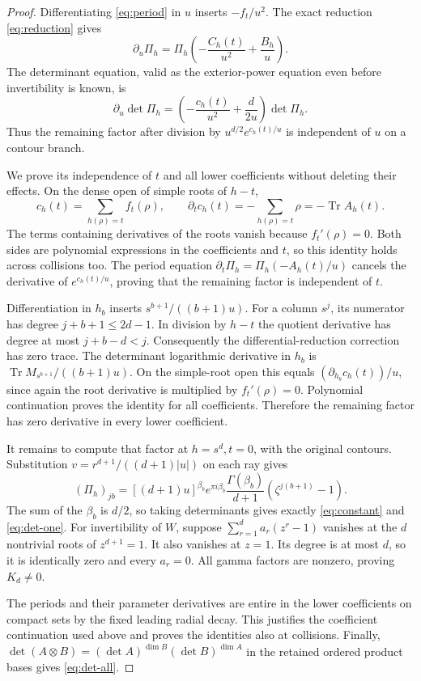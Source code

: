 \documentclass[11pt]{article}
\DeclareMathOperator{\Tr}{Tr}
\begin{document}
\begin{proof}
Differentiating \eqref{eq:period} in $u$ inserts $-f_t/u^2$.
The exact reduction \eqref{eq:reduction} gives
\[
 \partial_u\Pi_h=\Pi_h\left(-\frac{C_h(t)}{u^2}
                                    +\frac{B_h}u\right).
\]
The determinant equation, valid as the exterior-power equation even
before invertibility is known, is
\begin{equation}
 \partial_u\det\Pi_h=
     \left(-\frac{c_h(t)}{u^2}+\frac d{2u}\right)\det\Pi_h.
 \label{eq:det-ode}
\end{equation}
Thus the remaining factor after division by $u^{d/2}e^{c_h(t)/u}$
is independent of $u$ on a contour branch.

We prove its independence of $t$ and all lower coefficients without
deleting their effects.  On the dense open of simple roots of $h-t$,
\[
 c_h(t)=\sum_{h(\rho)=t}f_t(\rho),\qquad
 \partial_t c_h(t)=-\sum_{h(\rho)=t}\rho=-\Tr A_h(t).
\]
The terms containing derivatives of the roots vanish because
$f_t'(\rho)=0$.  Both sides are polynomial expressions in the
coefficients and $t$, so this identity holds across collisions too.
The period equation
$\partial_t\Pi_h=\Pi_h(-A_h(t)/u)$ cancels the derivative of
$e^{c_h(t)/u}$, proving that the remaining factor is independent of $t$.

Differentiation in $h_b$ inserts $s^{b+1}/((b+1)u)$.  For a column
$s^j$, its numerator has degree $j+b+1\le2d-1$.
In division by $h-t$ the quotient derivative has degree at most
$j+b-d<j$.  Consequently the differential-reduction correction has
zero trace.  The determinant logarithmic derivative in $h_b$ is
$\Tr M_{s^{b+1}}/((b+1)u)$.  On the simple-root open this equals
$(\partial_{h_b}c_h(t))/u$, since again the root derivative is multiplied
by $f_t'(\rho)=0$.  Polynomial continuation proves the identity for all
coefficients.  Therefore the remaining factor has zero derivative in
every lower coefficient.

It remains to compute that factor at $h=s^d,t=0$, with the original
contours.  Substitution $v=r^{d+1}/((d+1)|u|)$ on each ray gives
\begin{equation}
 (\Pi_h)_{jb}
  =[(d+1)u]^{\beta_b}e^{\pi i\beta_b}
        \frac{\Gamma(\beta_b)}{d+1}
             (\zeta^{j(b+1)}-1).
 \label{eq:gamma-columns}
\end{equation}
The sum of the $\beta_b$ is $d/2$, so taking determinants gives
exactly \eqref{eq:constant} and \eqref{eq:det-one}.
For invertibility of $W$, suppose
$\sum_{r=1}^d a_r(z^r-1)$ vanishes at the $d$ nontrivial roots of
$z^{d+1}=1$.  It also vanishes at $z=1$.  Its degree is at most $d$,
so it is identically zero and every $a_r=0$.  All gamma factors are
nonzero, proving $K_d\ne0$.

The periods and their parameter derivatives are entire in the lower
coefficients on compact sets by the fixed leading radial decay.
This justifies the coefficient continuation used above and proves the
identities also at collisions.  Finally,
$\det(A\otimes B)=(\det A)^{\dim B}(\det B)^{\dim A}$ in the
retained ordered product bases gives \eqref{eq:det-all}.
\end{proof}
\end{document}
